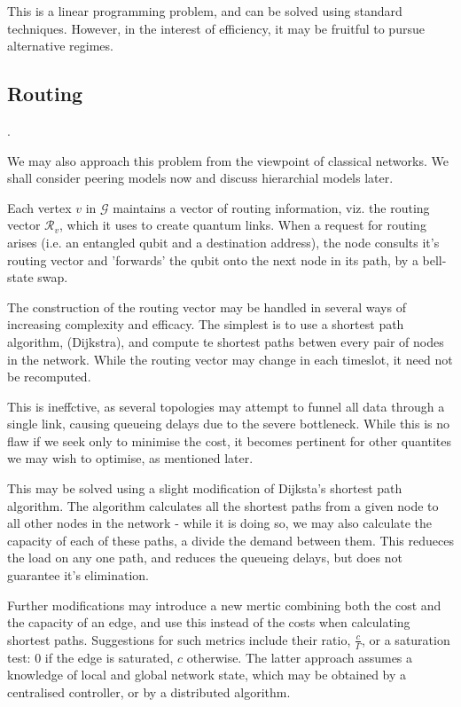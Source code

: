 \documentclass{amsart}
\begin{document}
    This is a linear programming problem, and can be solved using standard techniques. However, in the interest of efficiency, it may be fruitful to pursue alternative regimes.

    \subsection{Routing}.

    We may also approach this problem from the viewpoint of classical networks. We shall consider peering models now and discuss hierarchial models later. 

    Each vertex \(v\) in \(\mathcal{G}\) maintains a vector of routing information, viz. the routing vector \(\mathcal{R}_v\), which it uses to create quantum links. When a request for routing arises (i.e. an entangled qubit and a destination address), the node consults it's routing vector and 'forwards' the qubit onto the next node in its path, by a bell-state swap. 

    The construction of the routing vector may be handled in several ways of increasing complexity and efficacy. The simplest is to use a shortest path algorithm, (Dijkstra), and compute te shortest paths betwen every pair of nodes in the network. While the routing vector may change in each timeslot, it need not be recomputed. 
    
    This is ineffctive, as several topologies may attempt to funnel all data through a single link, causing queueing delays due to the severe bottleneck. While this is no flaw if we seek only to minimise the cost, it becomes pertinent for other quantites we may wish to optimise, as mentioned later.

    This may be solved using a slight modification of Dijksta's shortest path algorithm. The algorithm calculates all the shortest paths from a given node to all other nodes in the network - while it is doing so, we may also calculate the capacity of each of these paths, a divide the demand between them. This redueces the load on any one path, and reduces the queueing delays, but does not guarantee it's elimination.

    Further modifications may introduce a new mertic combining both the cost and the capacity of an edge, and use this instead of the costs when calculating shortest paths. Suggestions for such metrics include their ratio, \(\frac{c}{\Gamma}\), or a saturation test: 0 if the edge is saturated, \(c\) otherwise. The latter approach assumes a knowledge of local and global network state, which may be obtained by a centralised controller, or by a distributed algorithm. 
\end{document}
